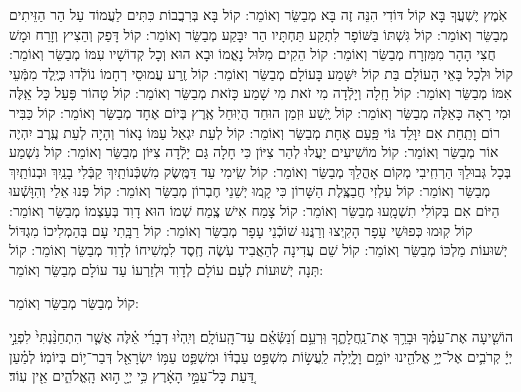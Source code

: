 \documentclass[twoside, openany, parskip=half, 11pt]{book}
\begin{document}
\begin{small}
אֹֽמֶץ יֶשְׁעֲךָ בָּא 			קוֹל דּוֹדִי הִנֵּה זֶה בָּא 			מְבַשֵּׂר וְאוֹמֵר: 
קוֹל בָּא בְּרִבֲבוֹת כִּתִּים 		לַעֲמוֹד עַל הַר הַזֵּיתִים 			מְבַשֵּׂר וְאוֹמֵר: 
קוֹל גִּשְׁתּוֹ בַּשּׁוֹפָר לִתְקַע 		תַּחְתָּיו הַר יִבָּקַע 			מְבַשֵּׂר וְאוֹמֵר: 
קוֹל דָּפַק וְהֵצִיץ וְזָרַח 			וּמָשׁ חֲצִי הָהָר מִמִּזְרָח 			מְבַשֵּׂר וְאוֹמֵר: 
קוֹל הֵקִים מִלּוּל נָאֳמוֹ 			וּבָא הוּא וְכָל קְדוֹשָׁיו עִמּוֹ 		מְבַשֵּׂר וְאוֹמֵר:
קוֹל וּלְכָל בָּאֵי הָעוֹלָם 			בַּת קוֹל יִשָּׁמַע בָּעוֹלָם 		מְבַשֵּׂר וְאוֹמֵר:
קוֹל זֶֽרַע עֲמוּסֵי רְחָמוֹ 			נוֹלְֿדוּ כְּיֶֽלֶד מִמְּֿעֵי אִמּוֹ 		מְבַשֵּׂר וְאוֹמֵר:
קוֹל חָֽלָה וְיָלְֿדָה מִי זֹאת 		מִי שָׁמַע כָּזֹאת 			מְבַשֵּׂר וְאוֹמֵר:
קוֹל טָהוֹר פָּעַל כָּל אֵֽלֶּה 		וּמִי רָאָה כָּאֵלֶּה 			מְבַשֵּׂר וְאוֹמֵר:
קוֹל יֶֽשַׁע וּזְמַן הוּחַד 			הֲיֽוּחַל אֶֽרֶץ בְּיוֹם אֶחָד 		מְבַשֵּׂר וְאוֹמֵר:
קוֹל כַּבִּיר רוֹם וָתַֽחַת 			אִם יִוָּלֵד גּוֹי פַּֽעַם אֶחָת 		מְבַשֵּׂר וְאוֹמֵר:
קוֹל לְעֵת יִגְאַל עַמּוֹ נָאוֹר 		וְהָיָה לְעֵת עֶֽרֶב יִהְיֶה אוֹר 		מְבַשֵּׂר וְאוֹמֵר:
קוֹל מוֹשִׁיעִים יַעֲלוּ לְהַר צִיּוֹן 		כִּי חָלָה גַּם יָלְֿדָה צִיּוֹן 			מְבַשֵּׂר וְאוֹמֵר:
קוֹל נִשְׁמַע בְּכָל גְּבוּלֵךְ 		הַרְחִֽיבִי מְקוֹם אָהֳלֵךְ 			מְבַשֵּׂר וְאוֹמֵר:
קוֹל שִֽׂימִי עַד דַּמֶּֽשֶׂק מִשְׁכְּֿנוֹתַֽיִךְ 	קַבְּֿלִי בָנַֽיִךְ וּבְנוֹתַֽיִךְ 			מְבַשֵּׂר וְאוֹמֵר:
קוֹל עִלְזִי חֲבַצֶּֽלֶת הַשָּׁרוֹן 		כִּי קָֽמוּ יְשֵׁנֵי חֶבְרוֹן 			מְבַשֵּׂר וְאוֹמֵר:
קוֹל פְּנוּ אֵלַי וְהִוָּשְֿׁעוּ 			הַיּוֹם אִם בְּקוֹלִי תִשְׁמָֽעוּ 		מְבַשֵּׂר וְאוֹמֵר:
קוֹל צָמַח אִישׁ צֶֽמַח שְׁמוֹ 		הוּא דָוִד בְּעַצְמוֹ 			מְבַשֵּׂר וְאוֹמֵר:
קוֹל קֽוּמוּ כְּפוּשֵׁי עָפָר 		הָקִֽיצוּ וְרַנֲּנוּ שׁוֹכְֿנֵי עָפָר 		מְבַשֵּׂר וְאוֹמֵר:
קוֹל רַבָּֽתִי עָם בְּהַמְלִיכוֹ 		מִגְדּוֹל יְשׁוּעוֹת מַלְכּוֹ 			מְבַשֵּׂר וְאוֹמֵר:
קוֹל שֵׁם עֲדִינָה לְהַאֲבִיד 		עֹֽשֶׂה חֶֽסֶד לִמְשִׁיחוֹ לְדָוִד 		מְבַשֵּׂר וְאוֹמֵר:
קוֹל תְּנָה יְשׁוּעוֹת לְעַם עוֹלָם 		לְדָוִד וּלְזַרְעוֹ עַד עוֹלָם 		מְבַשֵּׂר וְאוֹמֵר: 

\end{small}

\begin{large}
קוֹל מְבַשֵּׂר מְבַשֵּׂר וְאוֹמֵר:

\end{large}

הוֹשִׁ֤יעָה אֶת־עַמֶּ֗ךָ וּבָרֵ֥ךְ אֶת־נַֽחֲלָתֶ֑ךָ וּֽרְעֵ֥ם וְ֝נַשְּֿׂאֵ֗ם עַד־הָֽעוֹלָֽם׃ וְיִֽהְי֨וּ דְבָרַ֜י אֵ֗לֶּה אֲשֶׁ֤ר הִתְחַנַּ֨נְתִּי֙ לִפְנֵ֣י יְיָ֔ קְרֹבִ֛ים אֶל־יְיָ֥ אֱלֹהֵ֖ינוּ יוֹמָ֣ם וָלָ֑יְלָה לַֽעֲשׂ֣וֹת מִשְׁפַּ֣ט עַבְדּ֗וֹ וּמִשְׁפַּ֛ט עַמּ֥וֹ יִשְׂרָאֵ֖ל דְּבַר־י֥וֹם בְּיוֹמֽוֹ׃ לְמַ֗עַן דַּ֚עַת כָּל־עַמֵּ֣י הָאָ֔רֶץ כִּ֥י יְיָ֖ ה֣וּא הָֽאֱלֹהִ֑ים אֵ֖ין עֽוֹד׃

\end{document}
